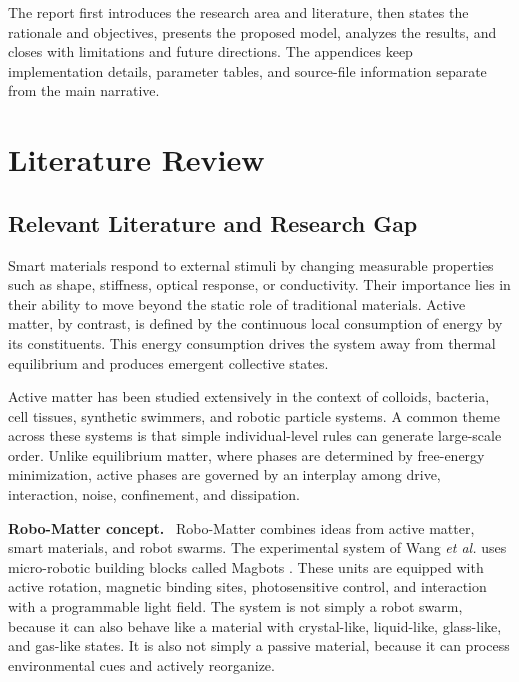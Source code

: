 \documentclass[12pt,a4paper,oneside]{report}
\newcommand{\runin}[1]{\vspace{0.45em}\noindent\textbf{#1.}\ }
\begin{document}
The report first introduces the research area and literature, then states the rationale and objectives, presents the proposed model, analyzes the results, and closes with limitations and future directions. The appendices keep implementation details, parameter tables, and source-file information separate from the main narrative.

\chapter{Literature Review}

\section{Relevant Literature and Research Gap}
Smart materials respond to external stimuli by changing measurable properties such as shape, stiffness, optical response, or conductivity. Their importance lies in their ability to move beyond the static role of traditional materials. Active matter, by contrast, is defined by the continuous local consumption of energy by its constituents. This energy consumption drives the system away from thermal equilibrium and produces emergent collective states.

Active matter has been studied extensively in the context of colloids, bacteria, cell tissues, synthetic swimmers, and robotic particle systems. A common theme across these systems is that simple individual-level rules can generate large-scale order. Unlike equilibrium matter, where phases are determined by free-energy minimization, active phases are governed by an interplay among drive, interaction, noise, confinement, and dissipation.

\runin{Robo-Matter concept}
Robo-Matter combines ideas from active matter, smart materials, and robot swarms. The experimental system of Wang \textit{et al.} uses micro-robotic building blocks called Magbots \cite{wang2024robomatter}. These units are equipped with active rotation, magnetic binding sites, photosensitive control, and interaction with a programmable light field. The system is not simply a robot swarm, because it can also behave like a material with crystal-like, liquid-like, glass-like, and gas-like states. It is also not simply a passive material, because it can process environmental cues and actively reorganize.
\end{document}
